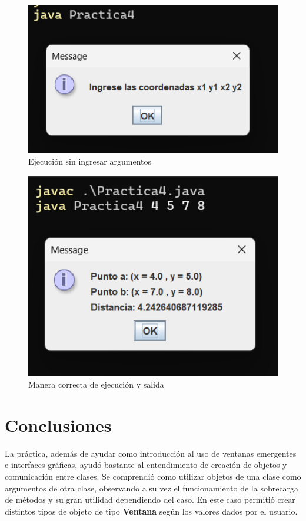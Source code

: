\documentclass[letterpaper,12pt]{article}
\begin{document}
\begin{figure}[H]
 \centering
    \includegraphics[width=1\textwidth]{Imagenes/p4.png}
    \caption*{Ejecución sin ingresar argumentos}
\end{figure}

\begin{figure}[H]
 \centering
    \includegraphics[width=1\textwidth]{Imagenes/ejecucion.png}
    \caption*{Manera correcta de ejecución y salida}
\end{figure}

\section{Conclusiones}
La práctica, además de ayudar como introducción al uso de ventanas emergentes e interfaces gráficas, ayudó bastante al entendimiento de creación de objetos y comunicación entre clases. Se comprendió como utilizar objetos de una clase como argumentos de otra clase, observando a su vez el funcionamiento de la sobrecarga de métodos y su gran utilidad dependiendo del caso. En este caso permitió crear distintos tipos de objeto de tipo \textbf{Ventana} según los valores dados por el usuario.
\end{document}
